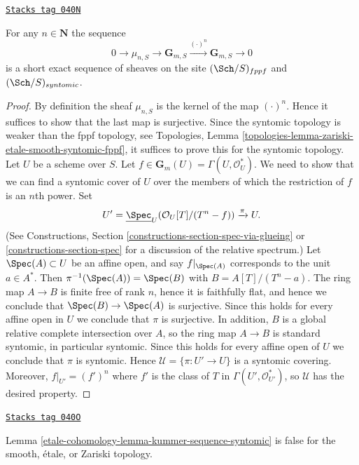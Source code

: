 \begin{lemma}
\label{etale-cohomology-lemma-kummer-sequence-syntomic}
\href{https://stacks.math.columbia.edu/tag/040N}{\texttt{Stacks tag 040N}}

For any $n \in \mathbf{N}$ the sequence
$$
0 \to
\mu_{n, S} \to
\mathbf{G}_{m, S} \xrightarrow{(\cdot)^n}
\mathbf{G}_{m, S} \to 0
$$
is a short exact sequence of sheaves on the site
$(\Sch/S)_{fppf}$ and $(\Sch/S)_{syntomic}$.
\end{lemma}

\begin{proof}
By definition the sheaf $\mu_{n, S}$ is the kernel of the map
$(\cdot)^n$. Hence it suffices to show that the last map is surjective.
Since the syntomic topology is weaker than the fppf topology, see
Topologies, Lemma \ref{topologies-lemma-zariski-etale-smooth-syntomic-fppf},
it suffices to prove this for the syntomic topology.
Let $U$ be a scheme over $S$. Let
$f \in \mathbf{G}_m(U) = \Gamma(U, \mathcal{O}_U^*)$.
We need to show that we can find a syntomic cover of
$U$ over the members of which the restriction of $f$ is an $n$th power.
Set
$$
U' =
\underline{\Spec}_U(\mathcal{O}_U[T]/(T^n-f))
\xrightarrow{\pi}
U.
$$
(See
Constructions, Section \ref{constructions-section-spec-via-glueing} or
\ref{constructions-section-spec}
for a discussion of the relative spectrum.)
Let $\Spec(A) \subset U$ be an affine open, and say $f|_{\Spec(A)}$ corresponds
to the unit $a \in A^*$. Then $\pi^{-1}(\Spec(A)) = \Spec(B)$ with
$B = A[T]/(T^n - a)$. The ring map $A \to B$ is finite free of rank $n$,
hence it is faithfully flat, and hence we conclude that
$\Spec(B) \to \Spec(A)$ is surjective. Since this holds for every
affine open in $U$ we conclude that $\pi$ is surjective.
In addition, $B$ is a global relative complete intersection over $A$, so
the ring map $A \to B$ is standard syntomic,
in particular syntomic. Since this holds for every affine open of $U$
we conclude that $\pi$ is syntomic. Hence
$\mathcal{U} = \{\pi : U' \to U\}$ is a syntomic covering.
Moreover, $f|_{U'} = (f')^n$ where $f'$ is the class of $T$
in $\Gamma(U', \mathcal{O}_{U'}^*)$, so $\mathcal{U}$ has the desired property.
\end{proof}

\begin{remark}
\label{etale-cohomology-remark-no-kummer-sequence-smooth-etale-zariski}
\href{https://stacks.math.columbia.edu/tag/040O}{\texttt{Stacks tag 040O}}

Lemma \ref{etale-cohomology-lemma-kummer-sequence-syntomic}
is false for the smooth, \'etale, or Zariski topology.
\end{remark}

